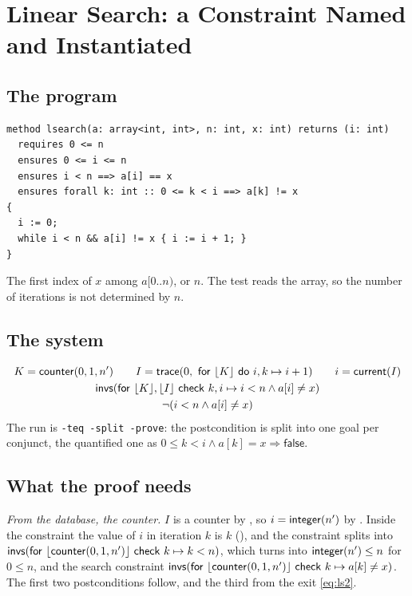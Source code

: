 \section{Linear Search: a Constraint Named and Instantiated}\label{sec:lsearch}

\subsection{The program}
\begin{lstlisting}
method lsearch(a: array<int, int>, n: int, x: int) returns (i: int)
  requires 0 <= n
  ensures 0 <= i <= n
  ensures i < n ==> a[i] == x
  ensures forall k: int :: 0 <= k < i ==> a[k] != x
{
  i := 0;
  while i < n && a[i] != x { i := i + 1; }
}
\end{lstlisting}
The first index of $x$ among $a[0..n)$, or $n$. The test reads the array, so the number of iterations is not
determined by $n$.

\subsection{The system}
\begin{gather}
  K = \mathsf{counter}(0, 1, n') \qquad I = \mathsf{trace}(0,\ \mathsf{for}\ \lfloor K\rfloor\ \mathsf{do}\ i, k \mapsto i + 1) \qquad i = \mathsf{current}(I) \label{eq:ls0}\\
  \mathsf{invs}(\mathsf{for}\ \lfloor K\rfloor, \lfloor I\rfloor\ \mathsf{check}\ k, i \mapsto i < n \wedge a[i] \ne x) \label{eq:ls1}\\
  \neg(i < n \wedge a[i] \ne x) \label{eq:ls2}
\end{gather}
The run is \texttt{-teq -split -prove}: the postcondition is split into one goal per conjunct, the quantified
one as $0 \le k < i \wedge a[k] = x \Rightarrow \mathsf{false}$.

\subsection{What the proof needs}
\emph{From the database, the counter.} $I$ is a counter by , so $i = \mathsf{integer}(n')$ by
. Inside the constraint the value of $i$ in iteration $k$ is $k$
(), and the constraint splits into $\mathsf{invs}(\mathsf{for}\ \lfloor \mathsf{counter}(0, 1, n')\rfloor\ \mathsf{check}\ k \mapsto k < n)$, which
 turns into $\mathsf{integer}(n') \le n$ for $0 \le n$, and the search
constraint $\mathsf{invs}(\mathsf{for}\ \lfloor \mathsf{counter}(0, 1, n')\rfloor\ \mathsf{check}\ k \mapsto a[k] \ne x)$. The first two postconditions follow, and the third
from the exit \eqref{eq:ls2}.

